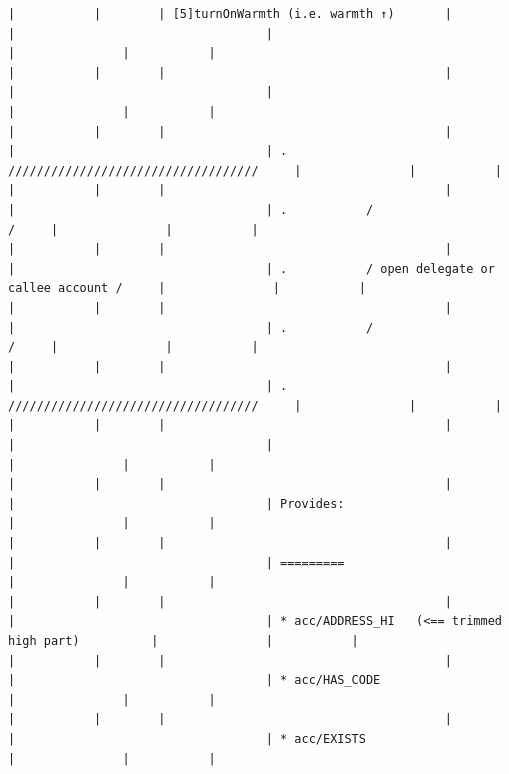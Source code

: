 \documentclass[varwidth=\maxdimen,margin=0.5cm,multi={verbatim}]{standalone}
\begin{document}
\begin{verbatim}
|           |        | [5]turnOnWarmth (i.e. warmth ↑)       |                                 |                                   |                                                     |               |           |
|           |        |                                       |                                 |                                   |                                                     |               |           |
|           |        |                                       |                                 |                                   | .           ///////////////////////////////////     |               |           |
|           |        |                                       |                                 |                                   | .           /                                 /     |               |           |
|           |        |                                       |                                 |                                   | .           / open delegate or callee account /     |               |           |
|           |        |                                       |                                 |                                   | .           /                                 /     |               |           |
|           |        |                                       |                                 |                                   | .           ///////////////////////////////////     |               |           |
|           |        |                                       |                                 |                                   |                                                     |               |           |
|           |        |                                       |                                 |                                   | Provides:                                           |               |           |
|           |        |                                       |                                 |                                   | =========                                           |               |           |
|           |        |                                       |                                 |                                   | * acc/ADDRESS_HI   (<== trimmed high part)          |               |           |
|           |        |                                       |                                 |                                   | * acc/HAS_CODE                                      |               |           |
|           |        |                                       |                                 |                                   | * acc/EXISTS                                        |               |           |

\end{verbatim}
\end{document}
